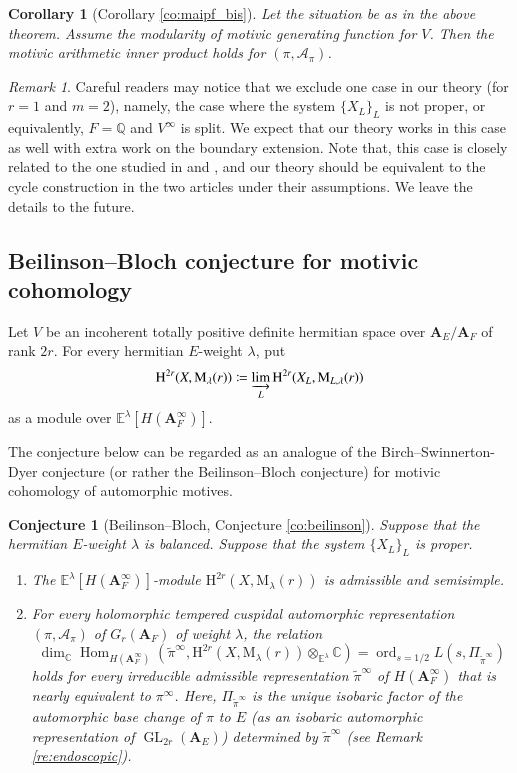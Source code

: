 \documentclass[12pt]{amsart}
\numberwithin{equation}{section}
\theoremstyle{plain}
\newtheorem{conjecture}[proposition]{Conjecture}
\newtheorem{corollary}[proposition]{Corollary}
\theoremstyle{definition}
\theoremstyle{remark}
\newtheorem{remark}[proposition]{Remark}
\renewcommand{\b}[1]{\mathbf{#1}}
\renewcommand{\c}[1]{\mathcal{#1}}
\renewcommand{\d}[1]{\mathbb{#1}}
\renewcommand{\r}[1]{\mathrm{#1}}
\renewcommand{\(}{\left(}
\renewcommand{\)}{\right)}
\newcommand{\bA}{\b A}
\newcommand{\cA}{\c A}
\newcommand{\dC}{\d C}
\newcommand{\dE}{\d E}
\newcommand{\dQ}{\d Q}
\newcommand{\rH}{\r H}
\newcommand{\rM}{\r M}
\DeclareMathOperator{\GL}{GL}
\DeclareMathOperator{\Hom}{Hom}
\DeclareMathOperator{\ord}{ord}
\begin{document}
\begin{corollary}[Corollary \ref{co:maipf_bis}]
Let the situation be as in the above theorem. Assume the modularity of motivic generating function for $V$. Then the motivic arithmetic inner product holds for $(\pi,\cA_\pi)$.
\end{corollary}


\begin{remark}
Careful readers may notice that we exclude one case in our theory (for $r=1$ and $m=2$), namely, the case where the system $\{X_L\}_L$ is not proper, or equivalently, $F=\dQ$ and $V^\infty$ is split. We expect that our theory works in this case as well with extra work on the boundary extension. Note that, this case is closely related to the one studied in \cite{Zha97} and \cite{LS}, and our theory should be equivalent to the cycle construction in the two articles under their assumptions. We leave the details to the future.
\end{remark}


\subsection{Beilinson--Bloch conjecture for motivic cohomology}



Let $V$ be an incoherent totally positive definite hermitian space over $\bA_E/\bA_F$ of rank $2r$. For every hermitian $E$-weight $\lambda$, put
\[
\rH^{2r}(X,\rM_{\lambda}(r))\coloneqq\varinjlim_L\rH^{2r}(X_L,\rM_{L,\lambda}(r))
\]
as a module over $\dE^\lambda[H(\bA_F^\infty)]$.

The conjecture below can be regarded as an analogue of the Birch--Swinnerton-Dyer conjecture (or rather the Beilinson--Bloch conjecture) for motivic cohomology of automorphic motives.

\begin{conjecture}[Beilinson--Bloch, Conjecture \ref{co:beilinson}]
Suppose that the hermitian $E$-weight $\lambda$ is balanced. Suppose that the system $\{X_L\}_L$ is proper.
\begin{enumerate}
  \item The $\dE^\lambda[H(\bA_F^\infty)]$-module $\rH^{2r}(X,\rM_{\lambda}(r))$ is admissible and semisimple.

  \item For every holomorphic tempered cuspidal automorphic representation $(\pi,\cA_\pi)$ of $G_r(\bA_F)$ of weight $\lambda$, the relation
      \[
      \dim_\dC\Hom_{H(\bA_F^\infty)}\(\tilde\pi^\infty,\rH^{2r}(X,\rM_{\lambda}(r))\otimes_{\dE^\lambda}\dC\)=
      \ord_{s=1/2}L(s,\Pi_{\tilde\pi^\infty})
      \]
      holds for every irreducible admissible representation $\tilde\pi^\infty$ of $H(\bA_F^\infty)$ that is nearly equivalent to $\pi^\infty$. Here, $\Pi_{\tilde\pi^\infty}$ is the unique isobaric factor of the automorphic base change of $\pi$ to $E$ (as an isobaric automorphic representation of $\GL_{2r}(\bA_E)$) determined by $\tilde\pi^\infty$ (see Remark \ref{re:endoscopic}).
\end{enumerate}
\end{conjecture}
\end{document}
